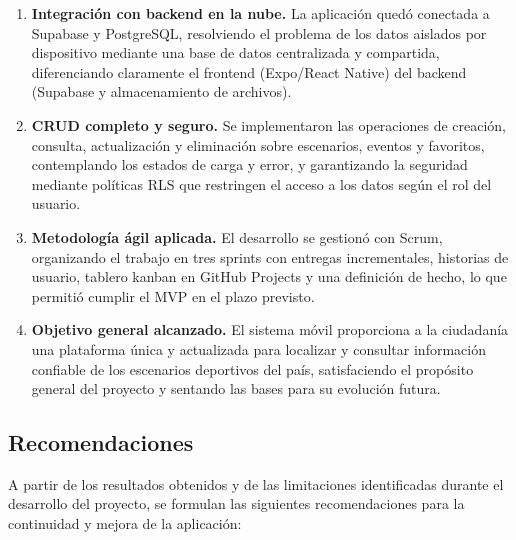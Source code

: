 \begin{enumerate}
  \item \textbf{Integraci\'on con backend en la nube.} La aplicaci\'on qued\'o
    conectada a Supabase y PostgreSQL, resolviendo el problema de los datos
    aislados por dispositivo mediante una base de datos centralizada y
    compartida, diferenciando claramente el frontend (Expo/React Native) del
    backend (Supabase y almacenamiento de archivos).

  \item \textbf{CRUD completo y seguro.} Se implementaron las operaciones de
    creaci\'on, consulta, actualizaci\'on y eliminaci\'on sobre escenarios,
    eventos y favoritos, contemplando los estados de carga y error, y
    garantizando la seguridad mediante pol\'iticas RLS que restringen el acceso
    a los datos seg\'un el rol del usuario.

  \item \textbf{Metodolog\'ia \'agil aplicada.} El desarrollo se gestion\'o con
    Scrum, organizando el trabajo en tres sprints con entregas incrementales,
    historias de usuario, tablero kanban en GitHub Projects y una definici\'on
    de hecho, lo que permiti\'o cumplir el MVP en el plazo previsto.

  \item \textbf{Objetivo general alcanzado.} El sistema m\'ovil proporciona a
    la ciudadan\'ia una plataforma \'unica y actualizada para localizar y
    consultar informaci\'on confiable de los escenarios deportivos del pa\'is,
    satisfaciendo el prop\'osito general del proyecto y sentando las bases para
    su evoluci\'on futura.
\end{enumerate}

\subsection*{Recomendaciones}

A partir de los resultados obtenidos y de las limitaciones identificadas
durante el desarrollo del proyecto, se formulan las siguientes recomendaciones
para la continuidad y mejora de la aplicaci\'on:

